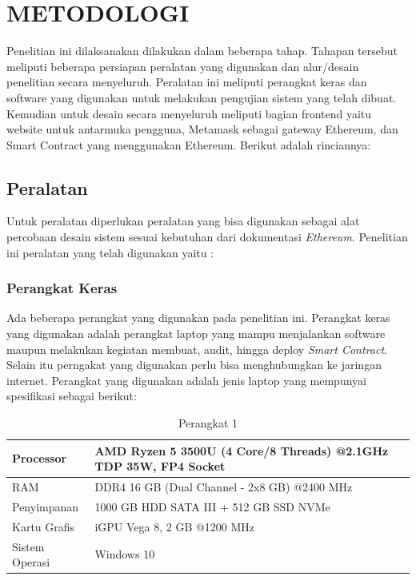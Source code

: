 \chapter{METODOLOGI}
\label{chap:metodologi}

Penelitian ini dilaksanakan dilakukan dalam beberapa tahap. Tahapan tersebut meliputi beberapa persiapan peralatan yang digunakan dan alur/desain penelitian secara menyeluruh. Peralatan ini meliputi perangkat keras dan software yang digunakan untuk melakukan pengujian sistem yang telah dibuat. Kemudian untuk desain secara menyeluruh meliputi bagian frontend yaitu website untuk antarmuka pengguna, Metamask sebagai gateway Ethereum, dan Smart Contract yang menggunakan Ethereum. Berikut adalah rinciannya:

\section{Peralatan}
\label{sec:peralatan}

Untuk peralatan diperlukan peralatan yang bisa digunakan sebagai alat percobaan desain sistem sesuai kebutuhan dari dokumentasi \emph{Ethereum}. Penelitian ini peralatan yang telah digunakan yaitu :

\subsection{Perangkat Keras}
\label{subsec:hardware}

Ada beberapa perangkat yang digunakan pada penelitian ini. Perangkat keras yang digunakan adalah perangkat laptop yang mampu menjalankan software maupun melakukan kegiatan membuat, audit, hingga deploy \emph{Smart Contract}. Selain itu perngakat yang digunakan perlu bisa menghubungkan ke jaringan internet. Perangkat yang digunakan adalah jenis laptop yang mempunyai spesifikasi sebagai berikut:

\begin{table}[htp] 
\caption{Perangkat 1}
\centering
\begin{tabular}
{|p{4cm}|p{9cm}|}
\hline
Processor & AMD Ryzen 5 3500U (4 Core/8 Threads) @2.1GHz TDP 35W, FP4 Socket \\ \hline
RAM & DDR4 16 GB (Dual Channel - 2x8 GB) @2400 MHz \\ \hline
Penyimpanan & 1000 GB HDD SATA III + 512 GB SSD NVMe \\ \hline
Kartu Grafis & iGPU Vega 8, 2 GB @1200 MHz \\ \hline
Sistem Operasi & Windows 10 \\ \hline 
\end{tabular}
\end{table}

